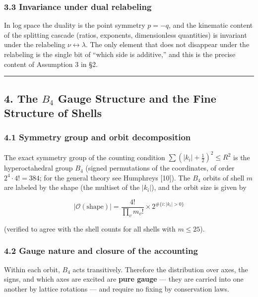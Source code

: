 \documentclass[
]{ltjsarticle}
\begin{document}
\subsubsection{3.3 Invariance under dual
relabeling}\label{invariance-under-dual-relabeling}

In log space the duality is the point symmetry \(p=-q\), and the
kinematic content of the splitting cascade (ratios, exponents,
dimensionless quantities) is invariant under the relabeling
\(\nu\leftrightarrow\lambda\). The only element that does not disappear
under the relabeling is the single bit of ``which side is additive,''
and this is the precise content of Assumption 3 in §2.

\begin{center}\rule{0.5\linewidth}{0.5pt}\end{center}

\subsection{\texorpdfstring{4. The \(B_4\) Gauge Structure and the Fine
Structure of
Shells}{4. The B\_4 Gauge Structure and the Fine Structure of Shells}}\label{the-b_4-gauge-structure-and-the-fine-structure-of-shells}

\subsubsection{4.1 Symmetry group and orbit
decomposition}\label{symmetry-group-and-orbit-decomposition}

The exact symmetry group of the counting condition
\(\sum(|k_i|+\tfrac12)^2\le R^2\) is the hyperoctahedral group \(B_4\)
(signed permutations of the coordinates, of order \(2^4\cdot4!=384\);
for the general theory see Humphreys {[}10{]}). The \(B_4\) orbits of
shell \(m\) are labeled by the shape (the multiset of the \(|k_i|\)),
and the orbit size is given by

\[
|\mathcal{O}(\text{shape})|=\frac{4!}{\prod_v m_v!}\times 2^{\#\{i:|k_i|>0\}}
\]

(verified to agree with the shell counts for all shells with
\(m\le25\)).

\subsubsection{4.2 Gauge nature and closure of the
accounting}\label{gauge-nature-and-closure-of-the-accounting}

Within each orbit, \(B_4\) acts transitively. Therefore the distribution
over axes, the signs, and which axes are excited are \textbf{pure gauge}
--- they are carried into one another by lattice rotations --- and
require no fixing by conservation laws.
\end{document}
